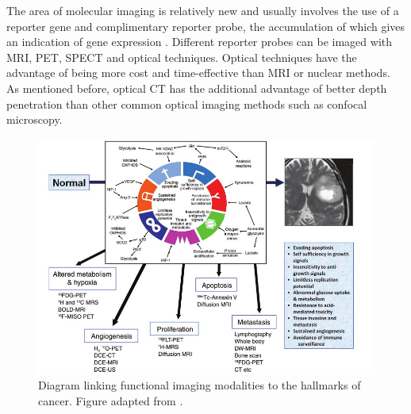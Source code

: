 	The area of molecular imaging is relatively new and usually involves the use of a reporter gene and complimentary reporter probe, the accumulation of which gives an indication of gene expression \cite{Blasberg:2003}. Different reporter probes can be imaged with MRI, PET, SPECT and optical techniques. Optical techniques have the advantage of being more cost and time-effective than MRI or nuclear methods. As mentioned before, optical CT has the additional advantage of better depth penetration than other common optical imaging methods such as confocal microscopy.
	
	
	
	
	
	\begin{figure}[H]
		\centering
		\includegraphics[scale=0.6]{intro_img/Padhani_2010_hallmarks.jpg}
		\caption{Diagram linking functional imaging modalities to the hallmarks of cancer. Figure adapted from \cite{Padhani:2010hfa}.} %
		\label{fig:padhani}
	\end{figure}
	
